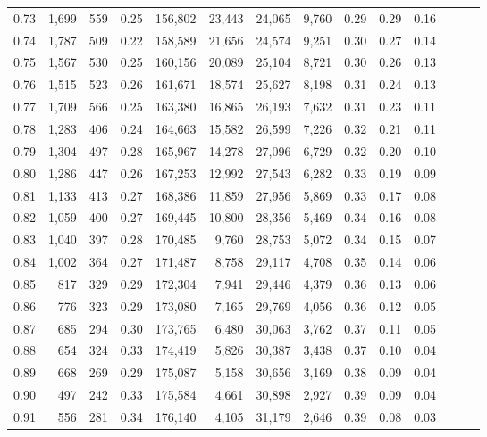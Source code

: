 \begin{tabular}{rrrrrrrrrrrrrr}
0.73 &  1,699 &  559 &  0.25 &  156,802 &   23,443 &  24,065 &   9,760 &  0.29 &  0.29 &      0.16 \\
0.74 &  1,787 &  509 &  0.22 &  158,589 &   21,656 &  24,574 &   9,251 &  0.30 &  0.27 &      0.14 \\
0.75 &  1,567 &  530 &  0.25 &  160,156 &   20,089 &  25,104 &   8,721 &  0.30 &  0.26 &      0.13 \\
0.76 &  1,515 &  523 &  0.26 &  161,671 &   18,574 &  25,627 &   8,198 &  0.31 &  0.24 &      0.13 \\
0.77 &  1,709 &  566 &  0.25 &  163,380 &   16,865 &  26,193 &   7,632 &  0.31 &  0.23 &      0.11 \\
0.78 &  1,283 &  406 &  0.24 &  164,663 &   15,582 &  26,599 &   7,226 &  0.32 &  0.21 &      0.11 \\
0.79 &  1,304 &  497 &  0.28 &  165,967 &   14,278 &  27,096 &   6,729 &  0.32 &  0.20 &      0.10 \\
0.80 &  1,286 &  447 &  0.26 &  167,253 &   12,992 &  27,543 &   6,282 &  0.33 &  0.19 &      0.09 \\
0.81 &  1,133 &  413 &  0.27 &  168,386 &   11,859 &  27,956 &   5,869 &  0.33 &  0.17 &      0.08 \\
0.82 &  1,059 &  400 &  0.27 &  169,445 &   10,800 &  28,356 &   5,469 &  0.34 &  0.16 &      0.08 \\
0.83 &  1,040 &  397 &  0.28 &  170,485 &    9,760 &  28,753 &   5,072 &  0.34 &  0.15 &      0.07 \\
0.84 &  1,002 &  364 &  0.27 &  171,487 &    8,758 &  29,117 &   4,708 &  0.35 &  0.14 &      0.06 \\
0.85 &    817 &  329 &  0.29 &  172,304 &    7,941 &  29,446 &   4,379 &  0.36 &  0.13 &      0.06 \\
0.86 &    776 &  323 &  0.29 &  173,080 &    7,165 &  29,769 &   4,056 &  0.36 &  0.12 &      0.05 \\
0.87 &    685 &  294 &  0.30 &  173,765 &    6,480 &  30,063 &   3,762 &  0.37 &  0.11 &      0.05 \\
0.88 &    654 &  324 &  0.33 &  174,419 &    5,826 &  30,387 &   3,438 &  0.37 &  0.10 &      0.04 \\
0.89 &    668 &  269 &  0.29 &  175,087 &    5,158 &  30,656 &   3,169 &  0.38 &  0.09 &      0.04 \\
0.90 &    497 &  242 &  0.33 &  175,584 &    4,661 &  30,898 &   2,927 &  0.39 &  0.09 &      0.04 \\
0.91 &    556 &  281 &  0.34 &  176,140 &    4,105 &  31,179 &   2,646 &  0.39 &  0.08 &      0.03 \\

\end{tabular}
